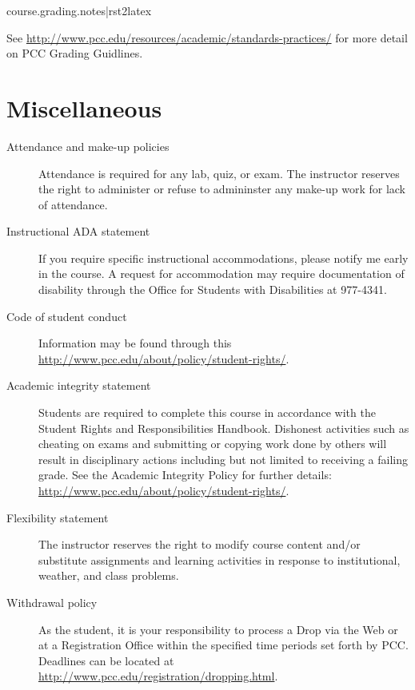 \documentclass{article}
\begin{document}
{{{{{{ course.grading.notes|rst2latex }}

See \url{http://www.pcc.edu/resources/academic/standards-practices/} for more detail on PCC Grading Guidlines.


\section{Miscellaneous}

\begin{description}
\item[{Attendance and make-up policies}] \leavevmode 
Attendance is required for any lab, quiz, or exam. The instructor reserves the right to administer or refuse to admininster any make-up work for lack of attendance.

\item[{Instructional ADA statement}] \leavevmode 
If you require specific instructional accommodations, please notify me early in the course. A request for accommodation may require documentation of disability through the Office for Students with Disabilities at 977-4341.

\item[{Code of student conduct}] \leavevmode 
Information may be found through this \url{http://www.pcc.edu/about/policy/student-rights/}.

\item[{Academic integrity statement}] \leavevmode 
Students are required to complete this course in accordance with the Student Rights and Responsibilities Handbook. Dishonest activities such as cheating on exams and submitting or copying work done by others will result in disciplinary actions including but not limited to receiving a failing grade. See the Academic Integrity Policy for further details: \url{http://www.pcc.edu/about/policy/student-rights/}.

\item[{Flexibility statement}] \leavevmode 
The instructor reserves the right to modify course content and/or substitute assignments and learning activities in response to institutional, weather, and class problems.

\item[{Withdrawal policy}] \leavevmode 
As the student, it is your responsibility to process a Drop via the Web or at a Registration Office within the specified time periods set forth by PCC. Deadlines can be located at \url{http://www.pcc.edu/registration/dropping.html}.

\end{description}

}}}}
\end{document}
